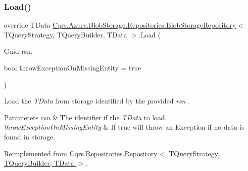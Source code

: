 \subsubsection{\texorpdfstring{Load()}{Load()}}
{\footnotesize\ttfamily override T\+Data \hyperlink{classCqrs_1_1Azure_1_1BlobStorage_1_1Repositories_1_1BlobStorageRepository}{Cqrs.\+Azure.\+Blob\+Storage.\+Repositories.\+Blob\+Storage\+Repository}$<$ T\+Query\+Strategy, T\+Query\+Builder, T\+Data $>$.Load (\begin{DoxyParamCaption}\item[{Guid}]{rsn,  }\item[{bool}]{throw\+Exception\+On\+Missing\+Entity = {\ttfamily true} }\end{DoxyParamCaption})\hspace{0.3cm}{\ttfamily [virtual]}}



Load the {\itshape T\+Data}  from storage identified by the provided {\itshape rsn} . 


\begin{DoxyParams}{Parameters}
{\em rsn} & The identifier if the {\itshape T\+Data}  to load.\\
\hline
{\em throw\+Exception\+On\+Missing\+Entity} & If true will throw an Exception if no data is found in storage.\\
\hline
\end{DoxyParams}


Reimplemented from \hyperlink{classCqrs_1_1Repositories_1_1Repository_a444e9dfe4710be90940dbb6dec9d856f_a444e9dfe4710be90940dbb6dec9d856f}{Cqrs.\+Repositories.\+Repository$<$ T\+Query\+Strategy, T\+Query\+Builder, T\+Data $>$}.

